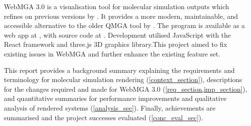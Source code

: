 WebMGA 3.0 is a visualisation tool for molecular simulation outputs which refines on previous versions by \textcite{Battistini_2021,webmga_2}. It provides a more modern, maintainable, and accessible alternative to the older QMGA tool by \textcite{gabriel2008molecular}. The program is available as a web app at , with source code at . Development utilised JavaScript with the React\cite{react} framework and three.js\cite{three} 3D graphics library.This project aimed to fix existing issues in WebMGA and further enhance the existing feature set.

This report provides a background summary explaining the requirements and terminology for molecular simulation rendering (\cref{context_section}), descriptions for the changes required and made for WebMGA 3.0 (\cref{req_section,imp_section}), and quantitative summaries for performance improvements and qualitative analysis of rendered systems (\cref{analysis_sec}). Finally, achievements are summarised and the project successes evaluated (\cref{conc_eval_sec}).


